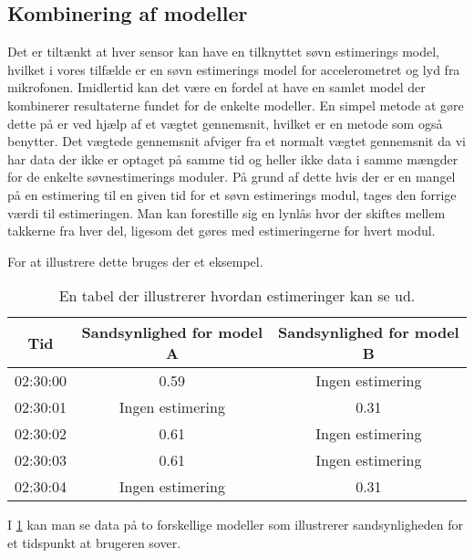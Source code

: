 \subsection{Kombinering af modeller}\label{subsec:kombimodeller}
Det er tiltænkt at hver sensor kan have en tilknyttet søvn estimerings model, hvilket i vores tilfælde er en søvn estimerings model for accelerometret og lyd fra mikrofonen.
Imidlertid kan det være en fordel at have en samlet model der kombinerer resultaterne fundet for de enkelte modeller.
En simpel metode at gøre dette på er ved hjælp af et vægtet gennemsnit, hvilket er en metode som \citet{6563918} også benytter.
Det vægtede gennemsnit afviger fra et normalt vægtet gennemsnit da vi har data der ikke er optaget på samme tid og heller ikke data i samme mængder for de enkelte søvnestimerings moduler.
På grund af dette hvis der er en mangel på en estimering til en given tid for et søvn estimerings modul, tages den forrige værdi til estimeringen.
Man kan forestille sig en lynlås hvor der skiftes mellem takkerne fra hver del, ligesom det gøres med estimeringerne for hvert modul.

For at illustrere dette bruges der et eksempel.

\newcommand{\nv}{Ingen estimering}

\begin{table}[h]
\centering
\begin{tabular}{|c|c|c|}
\hline Tid & Sandsynlighed for model A & Sandsynlighed for model B \\ 
\hline 02:30:00 & 	0.59     & \nv \\ 
\hline 02:30:01 & 	\nv     & 0.31 \\ 
\hline 02:30:02 & 	0.61    & \nv \\ 
\hline 02:30:03 & 	0.61    & \nv \\ 
\hline 02:30:04 & 	\nv     & 0.31 \\ 
\hline 
\end{tabular} 
\caption{En tabel der illustrerer hvordan estimeringer kan se ud.}
\label{tab:combiModelsExample}
\end{table}

I \cref{tab:combiModelsExample} kan man se data på to forskellige modeller som illustrerer sandsynligheden for et tidspunkt at brugeren sover.


